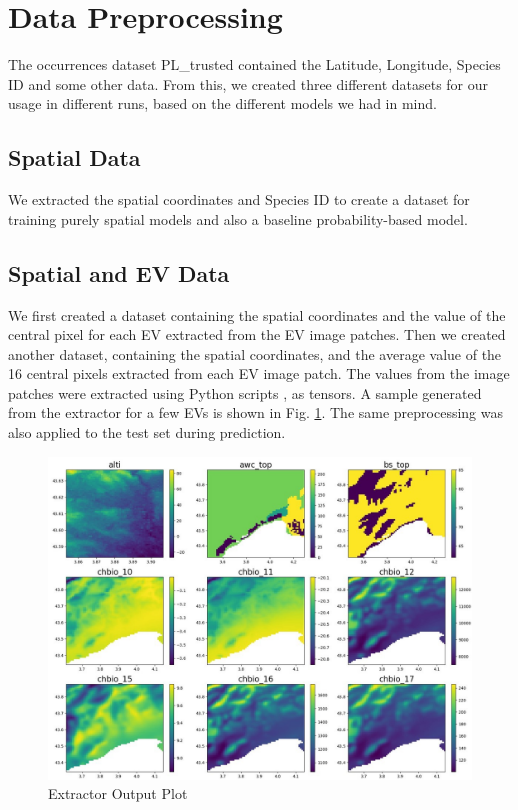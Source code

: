 \documentclass[runningheads]{llncs}
\begin{document}
\section{Data Preprocessing} 
The occurrences dataset PL\_trusted contained the Latitude, Longitude, Species ID and some other data. From this, we created three different datasets for our usage in different runs, based on the different models we had in mind. 
\subsection{Spatial Data}
We extracted the spatial coordinates and Species ID to create a dataset for training purely spatial models and also a baseline probability-based model. 
\subsection{Spatial and EV Data}
We first created a dataset containing the spatial coordinates and the value of the central pixel for each EV extracted from the EV image patches. Then we created another dataset, containing the spatial coordinates, and the average value of the 16 central pixels extracted from each EV image patch. The values from the image patches were extracted using Python scripts \cite{maxgit}, as tensors. A sample generated from the extractor for a few EVs is shown in Fig. \ref{fig:patch}. The same preprocessing was also applied to the test set during prediction.
\setlength{\abovecaptionskip}{15pt}
\setlength{\belowcaptionskip}{-7pt}
\begin{figure}[htbp]
    \centering
    \includegraphics[scale=0.25]{patchs.jpg}
    \caption{Extractor Output Plot}
    \label{fig:patch}
\end{figure}
\end{document}

